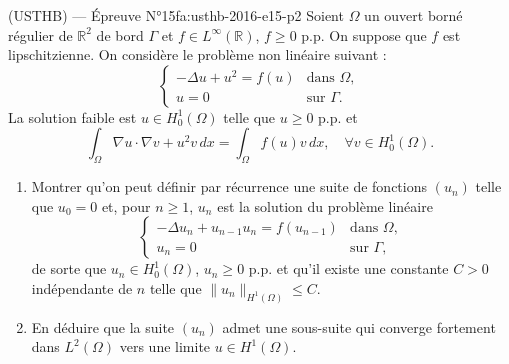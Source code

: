 \begin{problem}{(USTHB) — Épreuve N°15}{fa:usthb-2016-e15-p2}
Soient $\Omega$ un ouvert borné régulier de $\mathbb{R}^2$ de bord $\Gamma$ et $f\in L^{\infty}(\mathbb{R})$, $f\geq0$ p.p. On suppose que $f$ est lipschitzienne. On considère le problème non linéaire suivant :
$$\begin{cases}-\Delta u+u^2=f(u) & \text{dans } \Omega,\\ u=0 & \text{sur } \Gamma.\end{cases}$$
La solution faible est $u\in H_0^1(\Omega)$ telle que $u\geq0$ p.p. et
$$\int_{\Omega}\nabla u\cdot\nabla v+u^2v\,dx=\int_{\Omega}f(u)v\,dx,\quad\forall v\in H_0^1(\Omega).$$
\begin{enumerate}\item Montrer qu'on peut définir par récurrence une suite de fonctions $(u_n)$ telle que $u_0=0$ et, pour $n\geq1$, $u_n$ est la solution du problème linéaire
$$\begin{cases}-\Delta u_n+u_{n-1}u_n=f(u_{n-1}) & \text{dans } \Omega,\\ u_n=0 & \text{sur } \Gamma,\end{cases}$$
de sorte que $u_n\in H_0^1(\Omega)$, $u_n\geq0$ p.p. et qu'il existe une constante $C>0$ indépendante de $n$ telle que $\|u_n\|_{H^1(\Omega)}\leq C$.\item En déduire que la suite $(u_n)$ admet une sous-suite qui converge fortement dans $L^2(\Omega)$ vers une limite $u\in H^1(\Omega)$.\end{enumerate}
\end{problem}
\newpage

